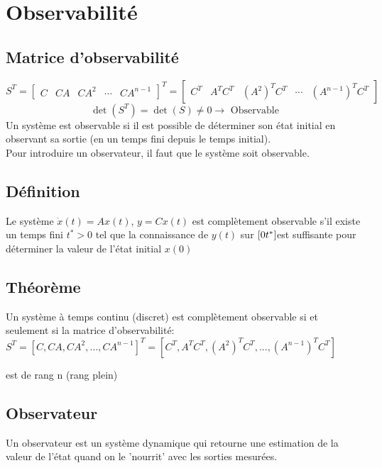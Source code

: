 \documentclass[resume]{subfiles}
\begin{document}
\section{Observabilité}

\subsection{Matrice d'observabilité}
$$S^T=\begin{bmatrix}
C & CA & CA^2 & \cdots & CA^{n-1}
\end{bmatrix}^T=\begin{bmatrix}
C^T & A^TC^T & (A^2)^TC^T & \cdots & (A^{n-1})^TC^T
\end{bmatrix}$$
$$\boxed{\det\left(S^T\right)=\det\left(S\right)\neq 0\longrightarrow\text{ Observable}}$$
Un système est observable si il est possible de déterminer son état initial en observant sa sortie (en un temps fini depuis le temps initial).\\
Pour introduire un observateur, il faut que le système soit observable.




\subsection{Définition}

Le système $\dot{x}(t) = Ax (t)$, $y = Cx(t)$   est complètement observable s'il existe un temps fini $t^* > 0$ tel que la  connaissance de $y (t)$  sur $[0\space t^*]$est suffisante pour déterminer la valeur de l'état initial $x(0)$

\subsection{Théorème}

Un système à temps continu (discret) est complètement observable si et  seulement si la matrice d'observabilité: $S^T = [C, CA, CA^2 ,..., CA^{n-1}]^T = [C^T, A^TC^T , (A^2)^T C^T,..., (A^{n-1})^T C^T]$ 

 est de rang n (rang plein)

\subsection{Observateur}

Un observateur est un système dynamique qui retourne une estimation de la valeur de l'état quand on le 'nourrit' avec les sorties mesurées.
\end{document}

